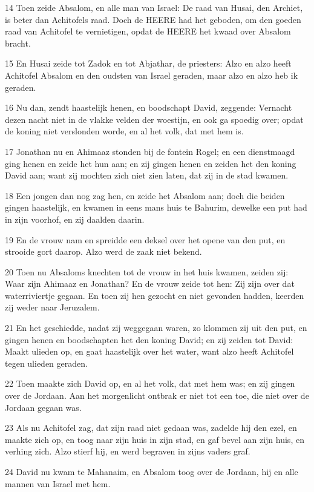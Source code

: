 \par 14 Toen zeide Absalom, en alle man van Israel: De raad van Husai, den Archiet, is beter dan Achitofels raad. Doch de HEERE had het geboden, om den goeden raad van Achitofel te vernietigen, opdat de HEERE het kwaad over Absalom bracht.
\par 15 En Husai zeide tot Zadok en tot Abjathar, de priesters: Alzo en alzo heeft Achitofel Absalom en den oudsten van Israel geraden, maar alzo en alzo heb ik geraden.
\par 16 Nu dan, zendt haastelijk henen, en boodschapt David, zeggende: Vernacht dezen nacht niet in de vlakke velden der woestijn, en ook ga spoedig over; opdat de koning niet verslonden worde, en al het volk, dat met hem is.
\par 17 Jonathan nu en Ahimaaz stonden bij de fontein Rogel; en een dienstmaagd ging henen en zeide het hun aan; en zij gingen henen en zeiden het den koning David aan; want zij mochten zich niet zien laten, dat zij in de stad kwamen.
\par 18 Een jongen dan nog zag hen, en zeide het Absalom aan; doch die beiden gingen haastelijk, en kwamen in eens mans huis te Bahurim, dewelke een put had in zijn voorhof, en zij daalden daarin.
\par 19 En de vrouw nam en spreidde een deksel over het opene van den put, en strooide gort daarop. Alzo werd de zaak niet bekend.
\par 20 Toen nu Absaloms knechten tot de vrouw in het huis kwamen, zeiden zij: Waar zijn Ahimaaz en Jonathan? En de vrouw zeide tot hen: Zij zijn over dat waterriviertje gegaan. En toen zij hen gezocht en niet gevonden hadden, keerden zij weder naar Jeruzalem.
\par 21 En het geschiedde, nadat zij weggegaan waren, zo klommen zij uit den put, en gingen henen en boodschapten het den koning David; en zij zeiden tot David: Maakt ulieden op, en gaat haastelijk over het water, want alzo heeft Achitofel tegen ulieden geraden.
\par 22 Toen maakte zich David op, en al het volk, dat met hem was; en zij gingen over de Jordaan. Aan het morgenlicht ontbrak er niet tot een toe, die niet over de Jordaan gegaan was.
\par 23 Als nu Achitofel zag, dat zijn raad niet gedaan was, zadelde hij den ezel, en maakte zich op, en toog naar zijn huis in zijn stad, en gaf bevel aan zijn huis, en verhing zich. Alzo stierf hij, en werd begraven in zijns vaders graf.
\par 24 David nu kwam te Mahanaim, en Absalom toog over de Jordaan, hij en alle mannen van Israel met hem.
